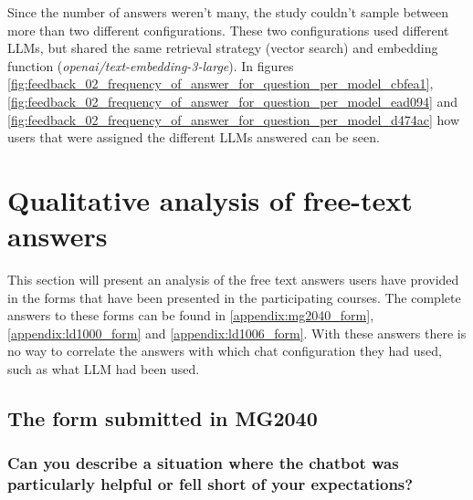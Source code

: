 





Since the number of answers weren't many, the study couldn’t sample between more than two different configurations. These two configurations used different \gls{LLM}s, but shared the same retrieval strategy (vector search) and embedding function (\textit{openai/text-embedding-3-large}). In figures \ref{fig:feedback_02_frequency_of_answer_for_question_per_model_cbfea1}, \ref{fig:feedback_02_frequency_of_answer_for_question_per_model_ead094} and \ref{fig:feedback_02_frequency_of_answer_for_question_per_model_d474ac} how users that were assigned the different \gls{LLM}s answered can be seen.











\section{Qualitative analysis of free-text answers}
\label{sec:qualitative_analysis_of_user_responses}


This section will present an analysis of the free text answers users have provided in the forms that have been presented in the participating courses. The complete answers to these forms can be found in \autoref{appendix:mg2040_form}, \autoref{appendix:ld1000_form} and \autoref{appendix:ld1006_form}. With these answers there is no way to correlate the answers with which chat configuration they had used, such as what \gls{LLM} had been used.


\subsection{The form submitted in MG2040}


\subsubsection{Can you describe a situation where the chatbot was particularly helpful or fell short of your expectations?}


